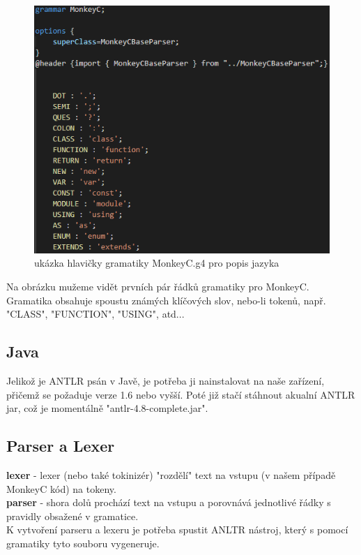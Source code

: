 \begin{figure}
	\centering
	\includegraphics[scale=0.8]{images/grammar}
	\caption{ukázka hlavičky gramatiky MonkeyC.g4 pro popis jazyka}
	\label{img:grammar}
\end{figure}

Na obrázku mužeme vidět prvních pár řádků gramatiky pro MonkeyC. Gramatika obsahuje spoustu známých klíčových slov, nebo-li tokenů, např. "CLASS", "FUNCTION", "USING", atd...

\subsection{Java}
Jelikož je ANTLR psán v Javě, je potřeba ji nainstalovat na naše zařízení, přičemž se požaduje verze 1.6 nebo vyšší. Poté již stačí stáhnout akualní ANTLR jar, což je momentálně "antlr-4.8-complete.jar".

\subsection{Parser a Lexer}
\textbf{lexer} - lexer (nebo také tokinizér) "rozdělí" text na vstupu (v našem případě MonkeyC kód) na tokeny. \cite{ANTLR_PG_20} \\
\textbf{parser} - shora dolů prochází text na vstupu a porovnává jednotlivé řádky s pravidly obsažené v gramatice.\\
K vytvoření parseru a lexeru je potřeba spustit ANLTR nástroj, který s pomocí gramatiky tyto souboru vygeneruje. \cite{ANTLR_PG_20} \\

